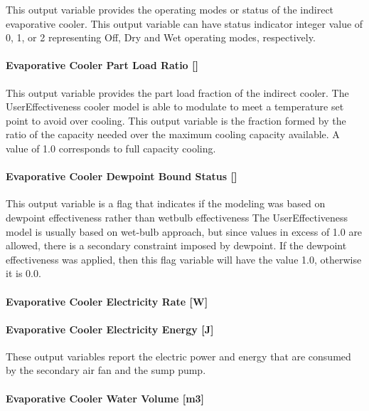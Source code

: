 This output variable provides the operating modes or status of the indirect evaporative cooler. This output variable can have status indicator integer value of 0, 1, or 2 representing Off, Dry and Wet operating modes, respectively.

\paragraph{Evaporative Cooler Part Load Ratio {[]}}\label{evaporative-cooler-part-load-ratio}

This output variable provides the part load fraction of the indirect cooler. The UserEffectiveness cooler model is able to modulate to meet a temperature set point to avoid over cooling. This output variable is the fraction formed by the ratio of the capacity needed over the maximum cooling capacity available. A value of 1.0 corresponds to full capacity cooling.

\paragraph{Evaporative Cooler Dewpoint Bound Status {[]}}\label{evaporative-cooler-dewpoint-bound-status}

This output variable is a flag that indicates if the modeling was based on dewpoint effectiveness rather than wetbulb effectiveness The UserEffectiveness model is usually based on wet-bulb approach, but since values in excess of 1.0 are allowed, there is a secondary constraint imposed by dewpoint. If the dewpoint effectiveness was applied, then this flag variable will have the value 1.0, otherwise it is 0.0.

\paragraph{Evaporative Cooler Electricity Rate {[}W{]}}\label{evaporative-cooler-electric-power-w-1}

\paragraph{Evaporative Cooler Electricity Energy {[}J{]}}\label{evaporative-cooler-electric-energy-j-4}

These output variables report the electric power and energy that are consumed by the secondary air fan and the sump pump.

\paragraph{Evaporative Cooler Water Volume {[}m3{]}}\label{evaporative-cooler-water-volume-m3-3}

